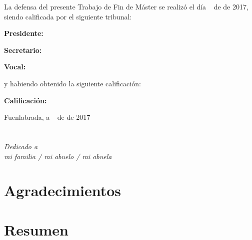 \documentclass[a4paper, 12pt]{book}
\newcommand{\TFM}{Trabajo de Fin de M\'aster\xspace}
\begin{document}
\vspace{1cm}
La defensa del presente \TFM se realizó el día \qquad$\;\,$ de \qquad\qquad\qquad\qquad \newline de 2017, siendo calificada por el siguiente tribunal:


\vspace{0.5cm}
\textbf{Presidente:}

\vspace{1.2cm}
\textbf{Secretario:}

\vspace{1.2cm}
\textbf{Vocal:}


\vspace{1.2cm}
y habiendo obtenido la siguiente calificación:

\vspace{1cm}
\textbf{Calificación:}


\vspace{1cm}
\begin{flushright}
Fuenlabrada, a \qquad$\;\,$ de \qquad\qquad\qquad\qquad de 2017
\end{flushright}


\chapter*{}
\begin{flushright}
\textit{Dedicado a \\
mi familia / mi abuelo / mi abuela}
\end{flushright}


\chapter*{Agradecimientos}




\chapter*{Resumen}


\end{document}
